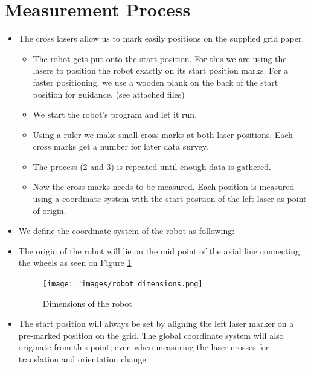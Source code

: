     \section{Measurement Process}
        \begin{itemize}
            \item The cross lasers allow us to mark easily positions on the supplied grid paper.
            
            \begin{itemize}
                \item [1.]	
            The robot gets put onto the start position. For this we are using the lasers to position the robot exactly on its start position marks. For a faster positioning, we use a wooden plank on the back of the start position for guidance. (see attached files)
            \item [2.] We start the robot's program and let it run.
            \item [3.] Using a ruler we make small cross marks at both laser positions. Each cross marks get a number for later data survey.
            \item [4.] The process (2 and 3) is repeated until enough data is gathered.
            \item [5.] Now the cross marks needs to be measured. Each position is measured using a coordinate system with the start position of the left laser as point of origin.
            \end{itemize}
            
            \item  We define the coordinate system of the robot as following: 
            \item The origin of the robot will lie on the mid point of the axial line connecting the wheels as seen on Figure \ref{fig:Dimensions of the robot} 
            
            \begin{figure}[!ht] 
                        \centering \texttt{[image: "images/robot\_dimensions.png]}
                        \caption{Dimensions of the robot}
                        \label{fig:Dimensions of the robot}
                 \end{figure}
            
            
            \item The start position will always be set by aligning the left laser marker on a pre-marked position on the grid. The global coordinate system will also originate from this point, even when measuring the laser crosses for translation and orientation change.
            

\end{itemize}
